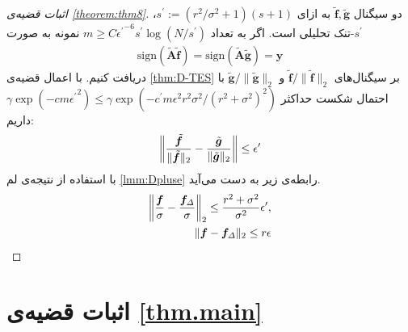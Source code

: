 \begin{proof}[اثبات قضیه‌ی \ref{theorem:thm8}]
دو سیگنال
$ \tilde{\bm{f}},\tilde{\bm{g}} $
به ازای
$ s^{\prime}:= (r^2/\sigma^2 +1)(s+1) $، 
$s^{\prime}$-تنک
تحلیلی است.
اگر به تعداد
$ m \geq C {\epsilon^{\prime}}^{-6} s^{\prime} \log{(N/s^{\prime})}$
نمونه به صورت
\begin{align}
\text{sign}(\tilde{\bm{A}}\tilde{\bm{f}})=\text{sign}(\tilde{\bm{A}}\tilde{\bm{g}})=\bm{y} 
\end{align}
دریافت کنیم. با اعمال قضیه‌ی
\ref{thm:D-TES}
بر سیگنال‌های
$ \tilde{\bm{f}}/\|\tilde{\bm{f}}\|_{2} $ 
و
$ \tilde{\bm{g}}/\|\tilde{\bm{g}}\|_{2} $ 
با احتمال شکست حداکثر
$ \gamma \exp{(-cm{\epsilon^{\prime}}^{2})} \leq \gamma \exp{(-c^{\prime}m\epsilon^{2}r^2\sigma^2/(r^2+\sigma^2)^{2} )} $
داریم:
\begin{align}
\left\lVert\dfrac{\tilde{\bm{f}}}{\|\tilde{\bm{f}}\|_{2}}-\dfrac{\tilde{\bm{g}}}{\|\tilde{\bm{g}}\|_{2}}\right\rVert\leq \epsilon^{\prime}
\end{align}
با استفاده از نتیجه‌ی لم
\ref{lmm:Dpluse}
رابطه‌ی زیر به دست می‌آید.
\begin{align}
\left\lVert\dfrac{\bm{f}}{\sigma}-\dfrac{\bm{f}_{\varDelta}}{\sigma}\right\rVert_{2}\leq \dfrac{r^2+\sigma^{2}}{\sigma^{2}} \epsilon^{\prime}, \\
 \|\bm{f}-\bm{f}_{\varDelta}\|_{2}\leq r\epsilon
\end{align}
\end{proof}


\section{اثبات قضیه‌ی 
\ref{thm.main}}
\label{Appndx2}

